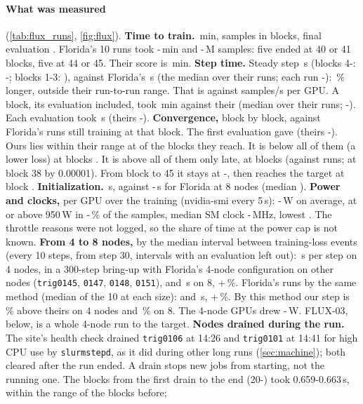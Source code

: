 \paragraph{What was measured} (\cref{tab:flux_runs}, \cref{fig:flux}). \textbf{Time to train.} \TriFxTttExact\,min, \TriFxSamples{} samples in \TriFxBlocks{} blocks, final evaluation \TriFxLastAcc. Florida's 10 runs took \TriFxFlTttLo-\TriFxFlTttHi\,min and \TriFxFlSamplesLo-\TriFxFlSamplesHi\,M samples: five ended at 40 or 41 blocks, five at 44 or 45. Their score is \TriFxFlTttExact\,min. \textbf{Step time.} Steady step \TriFxStep\,s (blocks 4-\TriFxBlocks: \TriFxStepLo-\TriFxStepHi; blocks 1-3: \TriFxBlockFirst), against Florida's \TriFxFlStep\,s (the median over their runs; each run \TriFxFlStepLo-\TriFxFlStepHi): \TriFxStepPct\,\% longer, outside their run-to-run range. That is \TriFxSpsGpu{} against \TriFxFlSpsGpu{} samples/s per GPU. A block, its evaluation included, took \TriFxTpb\,min against their \TriFxFlTpb{} (median over their runs; \TriFxFlTpbLo-\TriFxFlTpbHi). Each evaluation took \TriFxVal\,s (theirs \TriFxFlValLo-\TriFxFlValHi). \textbf{Convergence,} block by block, against Florida's runs still training at that block. The first evaluation gave \TriFxFirstAcc{} (theirs \TriFxFlFirstLo-\TriFxFlFirstHi). Ours lies within their range at \TriFxInside{} of the \TriFxCompared{} blocks they reach. It is below all of them (a lower loss) at blocks \TriFxBelow. It is above all of them only late, at blocks \TriFxAbove{} (against \TriFxAboveRuns{} runs; at block 38 by 0.00001). From block \TriFxLateFrom{} to 45 it stays at \TriFxLateLo-\TriFxLateHi, then reaches the target at block \TriFxBlocks. \textbf{Initialization.} \TriFxInit\,s, against \TriFxFlInitLo-\TriFxFlInitHi\,s for Florida at 8 nodes (median \TriFxFlInitMed). \textbf{Power and clocks,} per GPU over the training (nvidia-smi every 5\,s): \TriFxPowerLo-\TriFxPowerHi\,W on average, at or above 950\,W in \TriFxHotLo-\TriFxHotHi\,\% of the samples, median SM clock \TriFxSmLo-\TriFxSmHi\,MHz, lowest \TriFxSmMin. The throttle reasons were not logged, so the share of time at the power cap is not known. \textbf{From 4 to 8 nodes,} by the median interval between training-loss events (every 10 steps, from step 30, intervals with an evaluation left out): \TriFxTenFour\,s per step on 4 nodes, in a 300-step bring-up with Florida's 4-node configuration on other nodes (\texttt{trig0145}, \texttt{0147}, \texttt{0148}, \texttt{0151}), and \TriFxTenEight\,s on 8, +\TriFxTenPct\,\%. Florida's runs by the same method (median of the 10 at each size): \TriFxFlTenFour{} and \TriFxFlTenEight\,s, +\TriFxFlTenPct\,\%. By this method our step is \TriFxGapFour\,\% above theirs on 4 nodes and \TriFxGapEight\,\% on 8. The 4-node GPUs drew \TriFxPowerFourLo-\TriFxPowerFourHi\,W. FLUX-03, below, is a whole 4-node run to the target. \textbf{Nodes drained during the run.} The site's health check drained \texttt{trig0106} at 14:26 and \texttt{trig0101} at 14:41 for high CPU use by \texttt{slurmstepd}, as it did during other long runs (\cref{sec:machine}); both cleared after the run ended. A drain stops new jobs from starting, not the running one. The blocks from the first drain to the end (20-\TriFxBlocks) took 0.659-0.663\,s, within the range of the blocks before; 